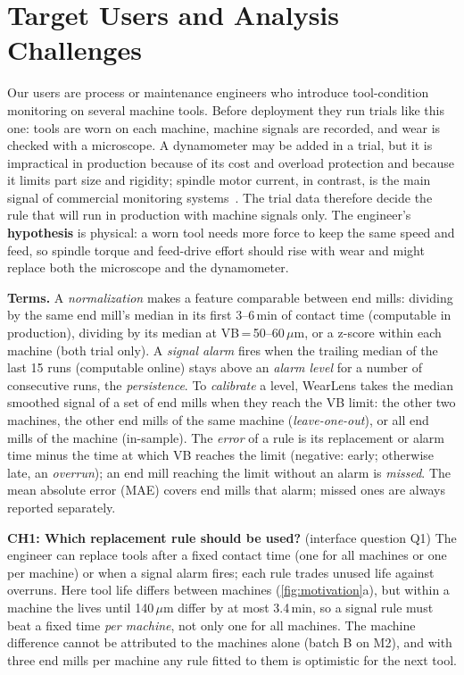 \documentclass{vgtc}                          %
\begin{document}
\section{Target Users and Analysis Challenges}
\label{sec:users}
Our users are process or maintenance engineers who introduce tool-condition monitoring on several machine tools. Before
deployment they run trials like this one: tools are worn on each machine, machine signals are recorded, and wear is
checked with a microscope. A dynamometer may be added in a trial, but it is impractical in production because of its cost
and overload protection and because it limits part size and rigidity; spindle motor current, in contrast, is the main
signal of commercial monitoring systems~\cite{mohamed2022}. The trial data therefore decide the rule that will run in
production with machine signals only. The engineer's \textbf{hypothesis} is physical: a worn tool needs more force to keep
the same speed and feed, so spindle torque and feed-drive effort should rise with wear and might replace both the
microscope and the dynamometer.

\textbf{Terms.} A \emph{normalization} makes a feature comparable between end mills: dividing by the same end mill's
median in its first 3--6\,min of contact time (computable in production), dividing by its median at VB\,=\,50--60\,$\mu$m,
or a z-score within each machine (both trial only). A \emph{signal alarm} fires when the trailing median of the last 15
runs (computable online) stays above an \emph{alarm level} for a number of consecutive runs, the \emph{persistence}. To
\emph{calibrate} a level, WearLens takes the median smoothed signal of a set of end mills when they reach the VB limit:
the other two machines, the other end mills of the same machine (\emph{leave-one-out}), or all end mills of the machine
(in-sample). The \emph{error} of a rule is its replacement or alarm time minus the time at which VB reaches the limit
(negative: early; otherwise late, an \emph{overrun}); an end mill reaching the limit without an alarm is \emph{missed}. The
mean absolute error (MAE) covers end mills that alarm; missed ones are always reported separately.

\textbf{CH1: Which replacement rule should be used?} (interface question Q1) The engineer can replace tools after a fixed
contact time (one for all machines or one per machine) or when a signal alarm fires; each rule trades unused life against
overruns. Here tool life differs between machines (\cref{fig:motivation}a), but within a machine the lives until
140\,$\mu$m differ by at most 3.4\,min, so a signal rule must beat a fixed time \emph{per machine}, not only one for all
machines. The machine difference cannot be attributed to the machines alone (batch B on M2), and with three end mills per
machine any rule fitted to them is optimistic for the next tool.
\end{document}

